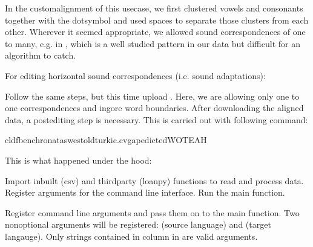 \documentclass[letterpaper,10pt,english]{sphinxmanual}
\begin{document}
\sphinxAtStartPar
In the custom\sphinxhyphen{}alignment of this use\sphinxhyphen{}case, we first clustered vowels and
consonants together with the dot\sphinxhyphen{}symbol and used spaces to separate those
clusters from each other. Wherever it seemed appropriate, we allowed sound
correspondences of one to many, e.g. in , which is a well studied
pattern in our data but difficult for an algorithm to catch.

\sphinxAtStartPar
For editing horizontal sound correspondences (i.e. sound adaptations):

\sphinxAtStartPar
Follow the same steps, but this time upload .
Here, we are allowing only one to one correspondences and ingore word
boundaries. After downloading the aligned data, a post\sphinxhyphen{}editing step is
necessary. This is carried out with following command:

\begin{sphinxVerbatim}[commandchars=\\\{\}]
cldfbenchronataswestoldturkic.cvgapedictedWOTEAH
\end{sphinxVerbatim}

\sphinxAtStartPar
This is what happened under the hood:

\label{\detokenize{mkedictor:module-ronataswestoldturkiccommands.cvgapedicted}}
\sphinxAtStartPar
Import inbuilt (csv) and third\sphinxhyphen{}party (loanpy) functions to read and process
data.
Register arguments for the command line interface. Run the main function.

\begin{fulllineitems}
\label{\detokenize{mkedictor:ronataswestoldturkiccommands.cvgapedicted.register}}
\pysigstartsignatures
{}
\pysigstopsignatures
\sphinxAtStartPar
Register command line arguments and pass them on to the main function.
Two non\sphinxhyphen{}optional arguments will be registered:
 (source language) and  (target langauge).
Only strings contained in column  in  are valid
arguments.

\end{fulllineitems}
\end{document}
